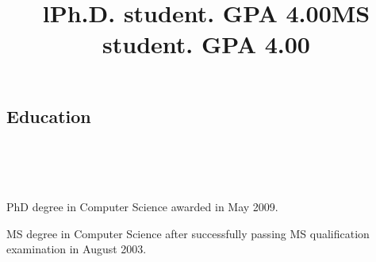 \documentclass[12pt,overlapped,line]{res}
\begin{document}
\begin{resume}





\section{Education}
\begin{format}
  \title{l}\\
  \\
  \body\\
\end{format}

\title{Ph.D. student. GPA 4.00}
\begin{position}
  PhD degree in Computer Science awarded in May 2009.
\end{position}

 \title{MS student. GPA 4.00}
 \begin{position}
  MS degree in Computer Science after successfully passing MS
 qualification examination in August 2003.
 \end{position}


\end{resume}
\end{document}
